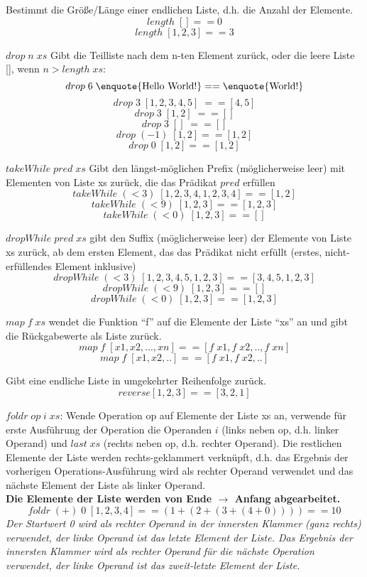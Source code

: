 Bestimmt die Größe/Länge einer endlichen Liste, d.h. die Anzahl der Elemente.
\example
$$length\; [] == 0$$
$$length\; [1,2,3] == 3$$

$drop\; n\; xs$ Gibt die Teilliste nach dem n-ten Element zurück, oder die leere Liste [], wenn $n > length\; xs$:
\example
$$drop\; 6\; \text{\enquote{Hello World!}} == \text{\enquote{World!}}$$
$$drop\; 3\; [1,2,3,4,5]\; == [4,5]$$
$$drop\; 3\; [1,2]\; == []$$
$$drop\; 3\; []\; == []$$
$$drop\; (-1)\; [1,2] == [1,2]$$
$$drop\; 0\; [1,2] == [1,2]$$

$takeWhile\; pred\; xs$ Gibt den längst-möglichen Prefix (möglicherweise leer) mit Elementen von Liste xs zurück, die das Prädikat $pred$ erfüllen
\example
$$takeWhile\; (< 3)\; [1,2,3,4,1,2,3,4] == [1,2]$$
$$takeWhile\; (< 9)\; [1,2,3] == [1,2,3]$$
$$takeWhile\; (< 0)\; [1,2,3] == []$$

$dropWhile\; pred\; xs$ gibt den Suffix (möglicherweise leer) der Elemente von Liste xs zurück, ab dem ersten Element, das das Prädikat nicht erfüllt (erstes, nicht-erfüllendes Element inklusive)
$$dropWhile\; (< 3)\; [1,2,3,4,5,1,2,3] == [3,4,5,1,2,3]$$
$$dropWhile\; (< 9)\; [1,2,3] == []$$
$$dropWhile\; (< 0)\; [1,2,3] == [1,2,3]$$

$map\; f\; xs$ wendet die Funktion \enquote{f} auf die Elemente der Liste \enquote{xs} an und gibt die Rückgabewerte als Liste zurück.
\example
$$map\; f\; [x1, x2, ..., xn] == [f\; x1, f\; x2, .., f\; xn]$$
$$map\; f\; [x1, x2, ..] == [f\; x1, f\; x2, ..]$$


Gibt eine endliche Liste in umgekehrter Reihenfolge zurück.
$$reverse [1,2,3] == [3,2,1]$$

$foldr\; op\; i\; xs$: Wende Operation op auf Elemente der Liste xs an, verwende für erste Ausführung der Operation die Operanden $i$ (links neben op, d.h. linker Operand) und $last\; xs$ (rechts neben op, d.h. rechter Operand). 
Die restlichen Elemente der Liste werden rechts-geklammert verknüpft, d.h. das Ergebnis der vorherigen Operations-Ausführung wird als rechter Operand verwendet und das nächste Element der Liste als linker Operand.\\
\textbf{Die Elemente der Liste werden von Ende $\rightarrow$ Anfang abgearbeitet.}
\example
$$foldr\; (+)\; 0\; [1,2,3,4] == (1+(2+(3+(4+0))))==10$$
\explain
\textit{Der Startwert 0 wird als rechter Operand in der innersten Klammer (ganz rechts) verwendet, der linke Operand ist das letzte Element der Liste. Das Ergebnis der innersten Klammer wird als rechter Operand für die nächste Operation verwendet, der linke Operand ist das zweit-letzte Element der Liste.}

